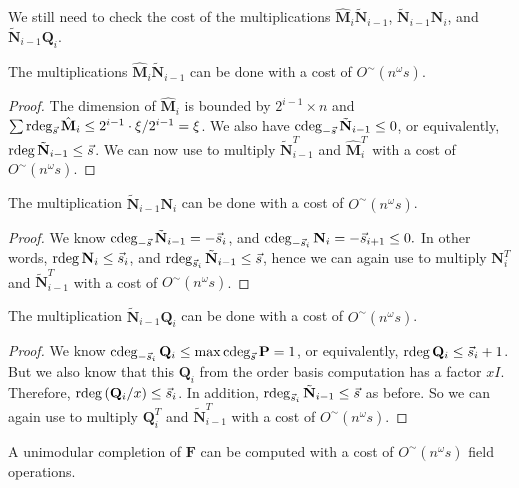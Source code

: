 

We still need to check the cost of the multiplications $\hat{\mathbf{M}}_{i}\tilde{\mathbf{N}}_{i-1}$,
$\tilde{\mathbf{N}}_{i-1}\mathbf{N}_{i}$, and $\tilde{\mathbf{N}}_{i-1}\mathbf{Q}_{i}$. 
\begin{lem}
The multiplications $\hat{\mathbf{M}}_{i}\tilde{\mathbf{N}}_{i-1}$
can be done with a cost of $O^{\sim}\left(n^{\omega}s\right)$.\end{lem}
\begin{proof}
The dimension of $\hat{\mathbf{M}}_{i}$ is bounded by $2^{i-1}\times n$
and $\sum\rdeg_{\vec{s}}\hat{\mathbf{M}}_{i}\le2^{i-1}\cdot\xi/2^{i-1}=\xi$.
We also have $\cdeg_{-\vec{s}}\tilde{\mathbf{N}}_{i-1}\le0$, or equivalently,
$\rdeg\tilde{\mathbf{N}}_{i-1}\le\vec{s}$. We can now use 
to multiply $\tilde{\mathbf{N}}_{i-1}^{T}$ and $\hat{\mathbf{M}}_{i}^{T}$
with a cost of $O^{\sim}\left(n^{\omega}s\right)$.\end{proof}
\begin{lem}
The multiplication $\tilde{\mathbf{N}}_{i-1}\mathbf{N}_{i}$ can be
done with a cost of $O^{\sim}\left(n^{\omega}s\right)$.\end{lem}
\begin{proof}
We know $\cdeg_{-\vec{s}}\tilde{\mathbf{N}}_{i-1}=-\vec{s}_{i}$,
and $\cdeg_{-\vec{s}_{i}}\mathbf{N}_{i}=-\vec{s}_{i+1}\le0.$ In other
words, $\rdeg\mathbf{N}_{i}\le\vec{s}_{i}$, and $\rdeg_{\vec{s}_{i}}\tilde{\mathbf{N}}_{i-1}\le\vec{s}$,
hence we can again use 
to multiply $\mathbf{N}_{i}^{T}$ and $\tilde{\mathbf{N}}_{i-1}^{T}$
with a cost of $O^{\sim}\left(n^{\omega}s\right)$.\end{proof}
\begin{lem}
The multiplication $\tilde{\mathbf{N}}_{i-1}\mathbf{Q}_{i}$ can be
done with a cost of $O^{\sim}\left(n^{\omega}s\right)$.\end{lem}
\begin{proof}
We know $\cdeg_{-\vec{s}_{i}}\mathbf{Q}_{i}\le\max\cdeg_{\vec{s}}\mathbf{P}=1$,
or equivalently, $\rdeg\mathbf{Q}_{i}\le\vec{s}_{i}+1$. But we also
know that this $\mathbf{Q}_{i}$ from the order basis computation
has a factor $xI$. Therefore, $\rdeg\left(\mathbf{Q}_{i}/x\right)\le\vec{s}_{i}$.
In addition, $\rdeg_{\vec{s}_{i}}\tilde{\mathbf{N}}_{i-1}\le\vec{s}$
as before. So we can again use 
to multiply $\mathbf{Q}_{i}^{T}$ and $\tilde{\mathbf{N}}_{i-1}^{T}$
with a cost of $O^{\sim}\left(n^{\omega}s\right)$.\end{proof}
\begin{thm}
A unimodular completion of $\mathbf{F}$ can be computed with a cost
of $O^{\sim}\left(n^{\omega}s\right)$ field operations.\end{thm}

